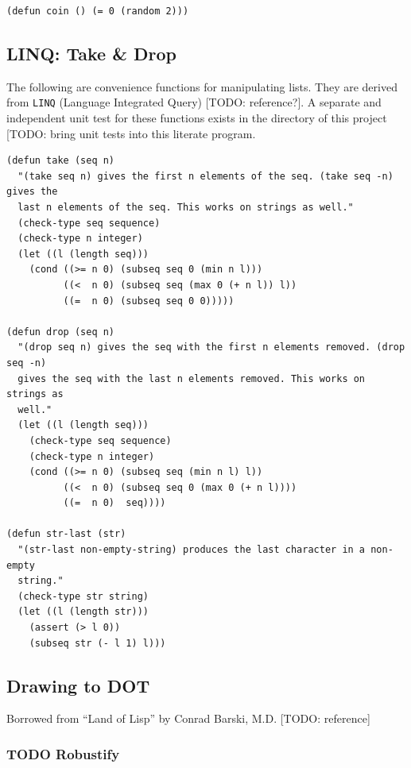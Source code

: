 \documentclass[10pt,oneside,x11names]{article}
\begin{document}
\begin{verbatim}
(defun coin () (= 0 (random 2)))
\end{verbatim}

\subsection{LINQ: Take \& Drop}
\label{sec:orgc9ced28}

The following are convenience functions for manipulating lists. They are
derived from \texttt{LINQ} (Language Integrated Query) [TODO: reference?]. A
separate and independent unit test for these functions exists in the
directory of this project [TODO: bring unit tests into this literate
program.

\begin{verbatim}
(defun take (seq n)
  "(take seq n) gives the first n elements of the seq. (take seq -n) gives the
  last n elements of the seq. This works on strings as well."
  (check-type seq sequence)
  (check-type n integer)
  (let ((l (length seq)))
    (cond ((>= n 0) (subseq seq 0 (min n l)))
          ((<  n 0) (subseq seq (max 0 (+ n l)) l))
          ((=  n 0) (subseq seq 0 0)))))

(defun drop (seq n)
  "(drop seq n) gives the seq with the first n elements removed. (drop seq -n)
  gives the seq with the last n elements removed. This works on strings as
  well."
  (let ((l (length seq)))
    (check-type seq sequence)
    (check-type n integer)
    (cond ((>= n 0) (subseq seq (min n l) l))
          ((<  n 0) (subseq seq 0 (max 0 (+ n l))))
          ((=  n 0)  seq))))

(defun str-last (str)
  "(str-last non-empty-string) produces the last character in a non-empty
  string."
  (check-type str string)
  (let ((l (length str)))
    (assert (> l 0))
    (subseq str (- l 1) l)))
\end{verbatim}

\subsection{Drawing to DOT}
\label{sec:orga2ed2d4}

Borrowed from ``Land of Lisp'' by Conrad Barski, M.D. [TODO: reference]

\subsubsection{{\bfseries\sffamily TODO} Robustify}
\label{sec:orgfa0b3a6}
\end{document}
